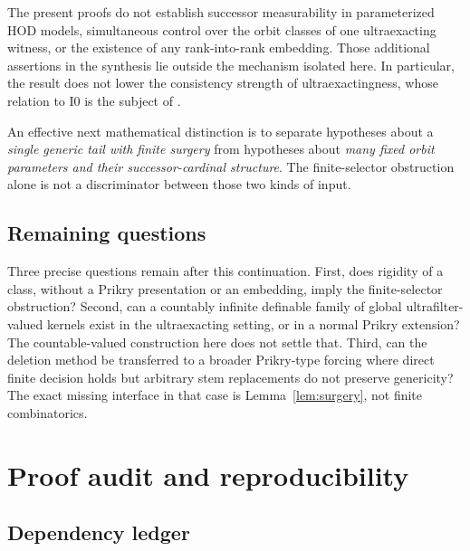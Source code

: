 \documentclass[11pt,letterpaper]{article}
\theoremstyle{definition}
\numberwithin{equation}{section}
\newcommand{\Izero}{\mathrm{I0}}
\begin{document}
The present proofs do not establish successor measurability in parameterized HOD models, simultaneous control over the orbit classes of one ultraexacting witness, or the existence of any rank-into-rank embedding. Those additional assertions in the synthesis lie outside the mechanism isolated here. In particular, the result does not lower the consistency strength of ultraexactingness, whose relation to $\Izero$ is the subject of \cite{abgl}.

An effective next mathematical distinction is to separate hypotheses about a \emph{single generic tail with finite surgery} from hypotheses about \emph{many fixed orbit parameters and their successor-cardinal structure}. The finite-selector obstruction alone is not a discriminator between those two kinds of input.

\subsection{Remaining questions}

Three precise questions remain after this continuation. First, does rigidity of a class, without a Prikry presentation or an embedding, imply the finite-selector obstruction? Second, can a countably infinite definable family of global ultrafilter-valued kernels exist in the ultraexacting setting, or in a normal Prikry extension? The countable-valued construction here does not settle that. Third, can the deletion method be transferred to a broader Prikry-type forcing where direct finite decision holds but arbitrary stem replacements do not preserve genericity? The exact missing interface in that case is Lemma~\ref{lem:surgery}, not finite combinatorics.

\appendix
\section{Proof audit and reproducibility}\label{sec:audit}

\subsection{Dependency ledger}
\end{document}
